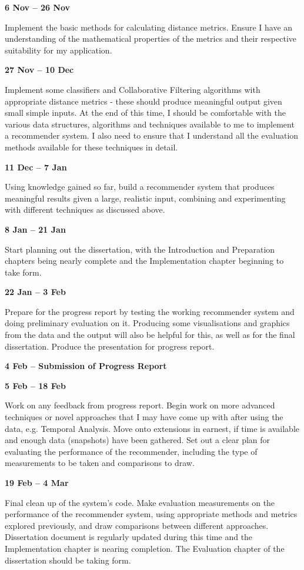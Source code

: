 \textbf{6 Nov -- 26 Nov}

Implement the basic methods for calculating distance metrics.
Ensure I have an understanding of the mathematical properties of the metrics 
and their respective suitability for my application.

\textbf{27 Nov -- 10 Dec}

Implement some classifiers and Collaborative Filtering algorithms with 
appropriate distance metrics - these should produce meaningful output given 
small simple inputs.
At the end of this time, I should be comfortable with the various data 
structures, algorithms and techniques available to me to implement a 
recommender system.
I also need to ensure that I understand all the evaluation methods available 
for these techniques in detail.

\textbf{11 Dec -- 7 Jan}

Using knowledge gained so far, build a recommender system that produces 
meaningful results given a large, realistic input, combining and experimenting 
with different techniques as discussed above.

\textbf{8 Jan -- 21 Jan}

Start planning out the dissertation, with the Introduction and Preparation 
chapters being nearly complete and the Implementation chapter beginning to take form.

\textbf{22 Jan -- 3 Feb}

Prepare for the progress report by testing the working recommender system and 
doing preliminary evaluation on it. Producing some visualisations and graphics 
from the data and the output will also be helpful for this, as well as for the 
final dissertation. 
Produce the presentation for progress report.

\textbf{4 Feb -- Submission of Progress Report}

\textbf{5 Feb -- 18 Feb}

Work on any feedback from progress report.
Begin work on more advanced techniques or novel approaches that I may have come 
up with after using the data, e.g. Temporal Analysis. Move onto extensions in 
earnest, if time is available and enough data (snapshots) have been gathered.
Set out a clear plan for evaluating the performance of the recommender, 
including the type of measurements to be taken and comparisons to draw.

\textbf{19 Feb -- 4 Mar}

Final clean up of the system's code.
Make evaluation measurements on the performance of the recommender system, 
using appropriate methods and metrics explored previously, and draw comparisons 
between different approaches.
Dissertation document is regularly updated during this time and the 
Implementation chapter is nearing completion.
The Evaluation chapter of the dissertation should be taking form.

